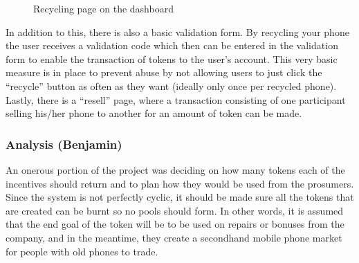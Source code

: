 \documentclass[11pt]{scrartcl}
\begin{document}
\begin{figure}[H]
    \caption{Recycling page on the dashboard}%
    \label{fig:recycle_web}
\end{figure}

In addition to this, there is also a basic validation form. By recycling your phone the user receives a validation code which then can be entered in the validation form to enable the transaction of tokens to the user's account. This very basic measure is in place to prevent abuse by not allowing users to just click the ``recycle'' button as often as they want (ideally only once per recycled phone). Lastly, there is a ``resell'' page, where a transaction consisting of one participant selling his/her phone to another for an amount of token can be made.

\subsubsection{Analysis (Benjamin)}

An onerous portion of the project was deciding on how many tokens each of the incentives should return and to plan how they would be used from the prosumers. Since the system is not perfectly cyclic, it should be made sure all the tokens that are created can be burnt so no pools should form. In other words, it is assumed that the end goal of the token will be to be used on repairs or bonuses from the company, and in the meantime, they create a secondhand mobile phone market for people with old phones to trade.
\end{document}
